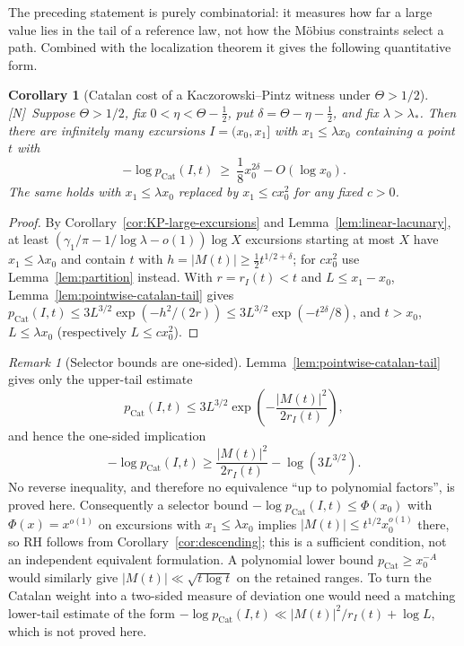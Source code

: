 \documentclass[11pt]{amsart}
\numberwithin{equation}{section}
\theoremstyle{plain}
\newtheorem{corollary}[theorem]{Corollary}
\theoremstyle{definition}
\theoremstyle{remark}
\newtheorem{remark}[theorem]{Remark}
\newcommand{\tagN}{\textup{[N]}}
\begin{document}
The preceding statement is purely combinatorial: it measures how far a large
value lies in the tail of a reference law, not how the M\"obius constraints
select a path. Combined with the localization theorem it gives the following
quantitative form.

\begin{corollary}[Catalan cost of a Kaczorowski--Pintz witness under $\Theta>1/2$]
\label{cor:catalan-surprise}
\tagN\ Suppose $\Theta>1/2$, fix $0<\eta<\Theta-\frac12$, put
$\delta=\Theta-\eta-\frac12$, and fix $\lambda>\lambda_*$. Then there are
infinitely many excursions $I=(x_0,x_1]$ with $x_1\le\lambda x_0$ containing
a point $t$ with
\begin{equation}
\label{eq:KP-catalan-surprise}
-\log p_{\mathrm{Cat}}(I,t)\ \ge\ \frac18x_0^{2\delta}-O(\log x_0).
\end{equation}
The same holds with $x_1\le\lambda x_0$ replaced by $x_1\le cx_0^2$ for any
fixed $c>0$.
\end{corollary}

\begin{proof}
By Corollary~\ref{cor:KP-large-excursions} and Lemma~\ref{lem:linear-lacunary},
at least $(\gamma_1/\pi-1/\log\lambda-o(1))\log X$ excursions starting at
most $X$ have $x_1\le\lambda x_0$ and contain $t$ with
$h=|M(t)|\ge\frac12t^{1/2+\delta}$; for $cx_0^2$ use
Lemma~\ref{lem:partition} instead. With $r=r_I(t)<t$ and $L\le x_1-x_0$,
Lemma~\ref{lem:pointwise-catalan-tail} gives
$p_{\mathrm{Cat}}(I,t)\le3L^{3/2}\exp(-h^2/(2r))\le3L^{3/2}\exp(-t^{2\delta}/8)$,
and $t>x_0$, $L\le\lambda x_0$ (respectively $L\le cx_0^2$).
\end{proof}

\begin{remark}[Selector bounds are one-sided]
\label{rem:catalan-selector-gap}
Lemma~\ref{lem:pointwise-catalan-tail} gives only the upper-tail estimate
\[
 p_{\mathrm{Cat}}(I,t)
 \le 3L^{3/2}\exp\!\left(-\frac{|M(t)|^2}{2r_I(t)}\right),
\]
and hence the one-sided implication
\[
 -\log p_{\mathrm{Cat}}(I,t)
 \ge \frac{|M(t)|^2}{2r_I(t)}-\log(3L^{3/2}).
\]
No reverse inequality, and therefore no equivalence ``up to polynomial
factors'', is proved here.  Consequently a selector bound
$-\log p_{\mathrm{Cat}}(I,t)\le\Phi(x_0)$ with
$\Phi(x)=x^{o(1)}$ on excursions with $x_1\le\lambda x_0$ implies
$|M(t)|\le t^{1/2}x_0^{o(1)}$ there, so RH follows from
Corollary~\ref{cor:descending}; this is a sufficient condition, not an
independent equivalent formulation.  A polynomial lower bound
$p_{\mathrm{Cat}}\ge x_0^{-A}$ would similarly give
$|M(t)|\ll\sqrt{t\log t}$ on the retained ranges.  To turn the Catalan
weight into a two-sided measure of deviation one would need a matching
lower-tail estimate of the form
$-\log p_{\mathrm{Cat}}(I,t)\ll |M(t)|^2/r_I(t)+\log L$, which is not proved
here.
\end{remark}
\end{document}
